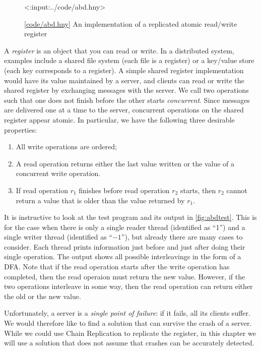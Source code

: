 \documentclass{report}
\newcommand{\harmonylink}[1]{%
[\href{https://harmony.cs.cornell.edu/#1}{\underline{#1}}]%
}
\newenvironment{code}{
\tcolorbox
}{
\endtcolorbox
}
\begin{document}
\begin{figure}
\begin{code}
<{:input:../code/abd.hny}>
\end{code}
\caption{\harmonylink{code/abd.hny} An implementation of a replicated atomic read/write register}
\label{fig:abd}
\end{figure}

A \emph{register} is an object that you can read or write.
In a distributed system, examples include a shared file system
(each file is a register) or a key/value store (each key corresponds
to a register).
A simple shared register implementation
would have its value maintained by a server, and clients can read or write the
shared register by exchanging messages with the server.
We call two operations such that one does not finish before the other starts
\emph{concurrent}.
Since messages are delivered one at a time to the server,
concurrent operations on the shared register appear atomic.
In particular, we have the following three desirable properties:
\begin{enumerate}
\item All write operations are ordered;
\item A read operation returns either the last value written or the value of
a concurrent write operation.
\item If read operation $r_1$ finishes before read operation $r_2$ starts,
then $r_2$ cannot return a value that is older than the value returned
by $r_1$.
\end{enumerate}

It is instructive to look at the test program and its output in
\autoref{fig:abdtest}.  This is for the case when there is only
a single reader thread (identified as ``1'') and a single writer
thread (identified as ``$-1$''), but already
there are many cases to consider.  Each thread prints information
just before and just after doing their single operation.  The output
shows all possible interleavings in the form of a DFA.  Note
that if the read operation starts after the write operation
has completed, then the read operaion must return the new value.
However, if the two operations interleave in some way, then the
read operation can return either the old or the new value.

%
Unfortunately, a server is a \emph{single point of failure}:
if it fails, all its clients suffer.
We would therefore like to find a solution that can survive the crash
of a server.
While we could use Chain Replication to replicate the register, in
this chapter we will use a solution that does not assume that
crashes can be accurately detected.
\end{document}
